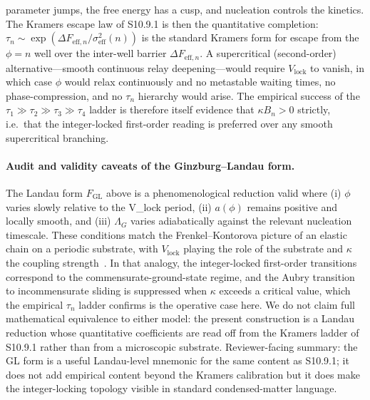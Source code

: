 \documentclass[11pt]{article}
\begin{document}
parameter jumps, the free energy has a cusp, and nucleation controls the
kinetics.  The Kramers escape law of S10.9.1 is then the quantitative
completion: $\tau_n\sim\exp(\Delta F_{\mathrm{eff},n}/\sigma_{\mathrm{eff}}^2(n))$
is the standard Kramers form for escape from the $\phi=n$ well over the
inter-well barrier $\Delta F_{\mathrm{eff},n}$.  A supercritical (second-order)
alternative---smooth continuous relay deepening---would require
$V_{\mathrm{lock}}$ to vanish, in which case $\phi$ would relax continuously
and no metastable waiting times, no phase-compression, and no $\tau_n$
hierarchy would arise.  The empirical success of the $\tau_1\gg\tau_2\gg\tau_3\gg\tau_4$
ladder is therefore itself evidence that $\kappa B_n>0$ strictly, i.e.\ that
the integer-locked first-order reading is preferred over any smooth
supercritical branching.

\paragraph{Audit and validity caveats of the Ginzburg--Landau form.}
The Landau form $F_{\mathrm{GL}}$ above is a phenomenological reduction valid where (i) $\phi$ varies slowly relative to the V_lock period, (ii) $a(\phi)$ remains positive and locally smooth, and (iii) $\Lambda_G$ varies adiabatically against the relevant nucleation timescale.  These conditions match the Frenkel--Kontorova picture of an elastic chain on a periodic substrate, with $V_{\mathrm{lock}}$ playing the role of the substrate and $\kappa$ the coupling strength~\cite{frenkelkontorova1938,aubry1983}.  In that analogy, the integer-locked first-order transitions correspond to the commensurate-ground-state regime, and the Aubry transition to incommensurate sliding is suppressed when $\kappa$ exceeds a critical value, which the empirical $\tau_n$ ladder confirms is the operative case here.  We do not claim full mathematical equivalence to either model: the present construction is a Landau reduction whose quantitative coefficients are read off from the Kramers ladder of S10.9.1 rather than from a microscopic substrate.  Reviewer-facing summary: the GL form is a useful Landau-level mnemonic for the same content as S10.9.1; it does not add empirical content beyond the Kramers calibration but it does make the integer-locking topology visible in standard condensed-matter language.
\end{document}
